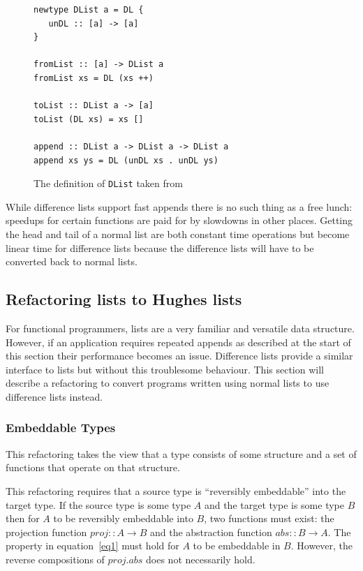 \begin{figure}[t]
\begin{lstlisting}
newtype DList a = DL {
   unDL :: [a] -> [a]
}

fromList :: [a] -> DList a
fromList xs = DL (xs ++)

toList :: DList a -> [a]
toList (DL xs) = xs []

append :: DList a -> DList a -> DList a
append xs ys = DL (unDL xs . unDL ys)
\end{lstlisting}
\caption{The definition of \texttt{DList} taken from~\citep{realWorldHaskell}}
\label{dlistDef}
\end{figure}

While difference lists support fast appends there is no such thing as a free lunch: speedups for certain functions are paid for by slowdowns in other places. Getting the head and tail of a normal list are both constant time operations but become linear time for difference lists because the difference lists will have to be converted back to normal lists. 


\subsection{Refactoring lists to Hughes lists}

For functional programmers, lists are a very familiar and versatile data structure. However, if an application requires repeated appends as described at the start of this section their performance becomes an issue. Difference lists provide a similar interface to lists but without this troublesome behaviour. This section will describe a refactoring to convert programs written using normal lists to use difference lists instead. 

\subsubsection{Embeddable Types} 
This refactoring takes the view that a type consists of some structure and a set of functions that operate on that structure. 

This refactoring requires that a source type is ``reversibly embeddable'' into the target type. If the source type is some type $A$ and the target type is some type $B$ then for $A$ to be reversibly embeddable into $B$, two functions must exist: the projection function $proj :: A \rightarrow B$ and the abstraction function $abs :: B \rightarrow A$. The property in equation~\ref{eq1} must hold for $A$ to be embeddable in $B$. However, the reverse compositions of $proj . abs$ does not necessarily hold.   

